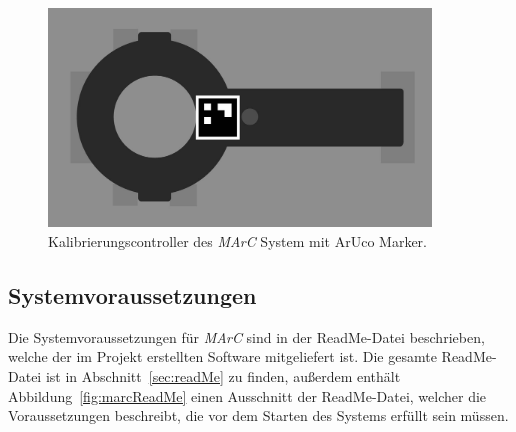 \begin{figure}[H]
	\centering
	\includegraphics[width=4in]{Bilder/CalibController.jpg}
	\caption{Kalibrierungscontroller des \textit{MArC} System mit ArUco Marker.}
	\label{fig:KontrollerMarc}
\end{figure}

\subsection{Systemvoraussetzungen}\label{sec:sysVor}
Die Systemvoraussetzungen für \emph{MArC} sind in der ReadMe-Datei beschrieben, welche der im Projekt erstellten Software mitgeliefert ist. Die gesamte ReadMe-Datei ist in Abschnitt~\ref{sec:readMe} zu finden, außerdem enthält Abbildung~\ref{fig:marcReadMe} einen Ausschnitt der ReadMe-Datei, welcher die Voraussetzungen beschreibt, die vor dem Starten des Systems erfüllt sein müssen.

